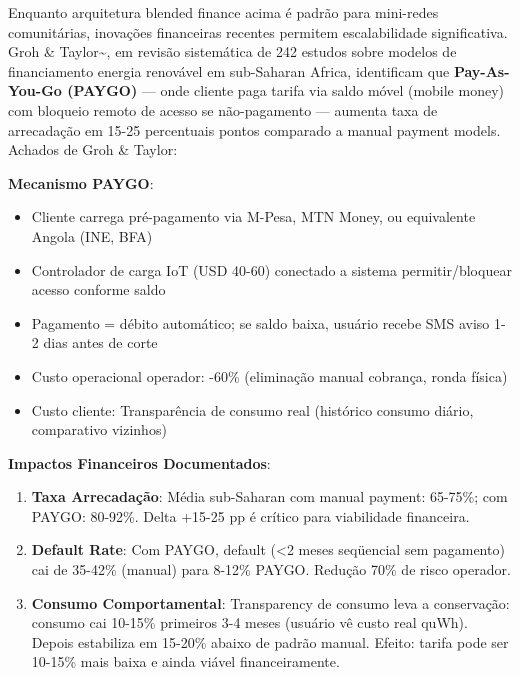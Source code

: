 \documentclass[12pt, a4paper]{article}
\begin{document}
Enquanto arquitetura blended finance acima é padrão para mini-redes comunitárias, inovações financeiras recentes permitem escalabilidade significativa. Groh \& Taylor\textasciitilde{}\citep{Groh2015}, em revisão sistemática de 242 estudos sobre modelos de financiamento energia renovável em sub-Saharan Africa, identificam que \textbf{Pay-As-You-Go (PAYGO)} — onde cliente paga tarifa via saldo móvel (mobile money) com bloqueio remoto de acesso se não-pagamento — aumenta taxa de arrecadação em 15-25 percentuais pontos comparado a manual payment models. Achados de Groh \& Taylor:

\textbf{Mecanismo PAYGO}:
\begin{itemize}
\item Cliente carrega pré-pagamento via M-Pesa, MTN Money, ou equivalente Angola (INE, BFA)
\item Controlador de carga IoT (USD 40-60) conectado a sistema permitir/bloquear acesso conforme saldo
\item Pagamento = débito automático; se saldo baixa, usuário recebe SMS aviso 1-2 dias antes de corte
\item Custo operacional operador: -60\% (eliminação manual cobrança, ronda física)
\item Custo cliente: Transparência de consumo real (histórico consumo diário, comparativo vizinhos)
\end{itemize}

\textbf{Impactos Financeiros Documentados}:
\begin{enumerate}
\item \textbf{Taxa Arrecadação}: Média sub-Saharan com manual payment: 65-75\%; com PAYGO: 80-92\%. Delta +15-25 pp é crítico para viabilidade financeira.
\item \textbf{Default Rate}: Com PAYGO, default (<2 meses seqüencial sem pagamento) cai de 35-42\% (manual) para 8-12\% PAYGO. Redução 70\% de risco operador.
\item \textbf{Consumo Comportamental}: Transparency de consumo leva a conservação: consumo cai 10-15\% primeiros 3-4 meses (usuário vê custo real quWh). Depois estabiliza em 15-20\% abaixo de padrão manual. Efeito: tarifa pode ser 10-15\% mais baixa e ainda viável financeiramente.
\end{enumerate}
\end{document}
